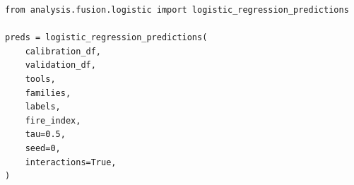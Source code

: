 \begin{lstlisting}[caption={Implementazione Logistic Regression con interazioni in analysis/fusion/logistic.py}]
from analysis.fusion.logistic import logistic_regression_predictions

preds = logistic_regression_predictions(
    calibration_df,
    validation_df,
    tools,
    families,
    labels,
    fire_index,
    tau=0.5,
    seed=0,
    interactions=True,
)
\end{lstlisting}
